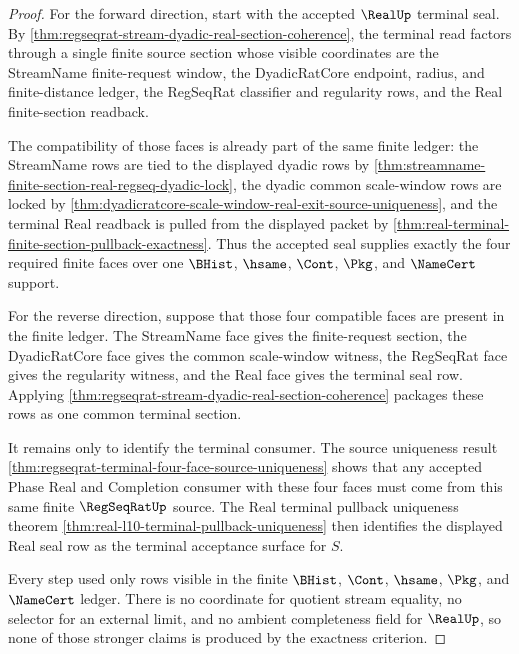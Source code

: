 \begin{proof}
For the forward direction, start with the accepted $\RealUp$ terminal seal. By
\autoref{thm:regseqrat-stream-dyadic-real-section-coherence}, the terminal read
factors through a single finite source section whose visible coordinates are
the StreamName finite-request window, the DyadicRatCore endpoint, radius, and
finite-distance ledger, the RegSeqRat classifier and regularity rows, and the
Real finite-section readback.

The compatibility of those faces is already part of the same finite ledger:
the StreamName rows are tied to the displayed dyadic rows by
\autoref{thm:streamname-finite-section-real-regseq-dyadic-lock}, the dyadic
common scale-window rows are locked by
\autoref{thm:dyadicratcore-scale-window-real-exit-source-uniqueness}, and the
terminal Real readback is pulled from the displayed packet by
\autoref{thm:real-terminal-finite-section-pullback-exactness}. Thus the
accepted seal supplies exactly the four required finite faces over one
$\BHist$, $\hsame$, $\Cont$, $\Pkg$, and $\NameCert$ support.

For the reverse direction, suppose that those four compatible faces are
present in the finite ledger. The StreamName face gives the finite-request
section, the DyadicRatCore face gives the common scale-window witness, the
RegSeqRat face gives the regularity witness, and the Real face gives the
terminal seal row. Applying
\autoref{thm:regseqrat-stream-dyadic-real-section-coherence} packages these
rows as one common terminal section.

It remains only to identify the terminal consumer. The source uniqueness
result \autoref{thm:regseqrat-terminal-four-face-source-uniqueness} shows that
any accepted Phase Real and Completion consumer with these four faces must
come from this same finite $\RegSeqRatUp$ source. The Real terminal pullback
uniqueness theorem \autoref{thm:real-l10-terminal-pullback-uniqueness} then
identifies the displayed Real seal row as the terminal acceptance surface for
$S$.

Every step used only rows visible in the finite $\BHist$, $\Cont$, $\hsame$,
$\Pkg$, and $\NameCert$ ledger. There is no coordinate for quotient stream
equality, no selector for an external limit, and no ambient completeness field
for $\RealUp$, so none of those stronger claims is produced by the exactness
criterion.
\end{proof}

